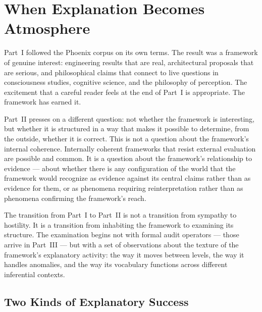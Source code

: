 
\chapter{When Explanation Becomes Atmosphere}
\label{ch:explanation-atmosphere}


\noindent
Part~I followed the Phoenix corpus on its own terms. The result
was a framework of genuine interest: engineering results that
are real, architectural proposals that are serious, and
philosophical claims that connect to live questions in consciousness
studies, cognitive science, and the philosophy of perception.
The excitement that a careful reader feels at the end of Part~I
is appropriate. The framework has earned it.

Part~II presses on a different question: not whether the framework
is interesting, but whether it is structured in a way that makes
it possible to determine, from the outside, whether it is correct.
This is not a question about the framework's internal coherence.
Internally coherent frameworks that resist external evaluation
are possible and common. It is a question about the framework's
relationship to evidence --- about whether there is any
configuration of the world that the framework would recognize
as evidence against its central claims rather than as evidence
for them, or as phenomena requiring reinterpretation rather
than as phenomena confirming the framework's reach.

The transition from Part~I to Part~II is not a transition from
sympathy to hostility. It is a transition from inhabiting the
framework to examining its structure. The examination begins
not with formal audit operators --- those arrive in Part~III
--- but with a set of observations about the texture of the
framework's explanatory activity: the way it moves between
levels, the way it handles anomalies, and the way its
vocabulary functions across different inferential contexts.

\section{Two Kinds of Explanatory Success}
\label{sec:two-kinds}

